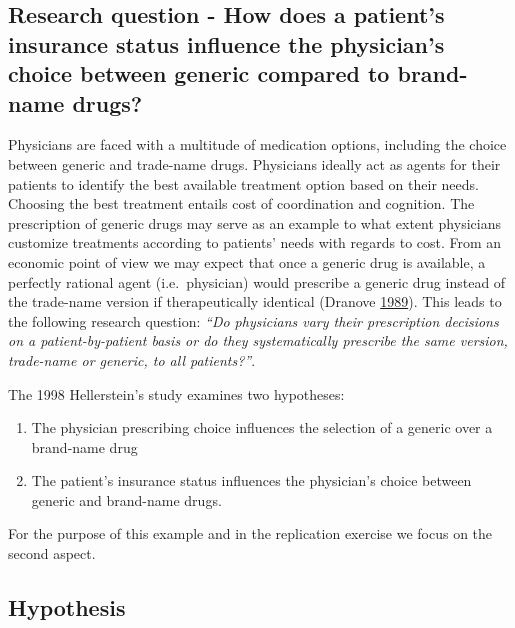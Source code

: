 \documentclass[
]{book}
\providecommand{\tightlist}{%
  \setlength{\itemsep}{0pt}\setlength{\parskip}{0pt}}
\begin{document}
\hypertarget{research-question---how-does-a-patients-insurance-status-influence-the-physicians-choice-between-generic-compared-to-brand-name-drugs}{%
\subsection{\texorpdfstring{\textbf{Research question - How does a
patient's insurance status influence the physician's choice between
generic compared to brand-name
drugs?}}{Research question - How does a patient's insurance status influence the physician's choice between generic compared to brand-name drugs?}}\label{research-question---how-does-a-patients-insurance-status-influence-the-physicians-choice-between-generic-compared-to-brand-name-drugs}}

Physicians are faced with a multitude of medication options, including
the choice between generic and trade-name drugs. Physicians ideally act
as agents for their patients to identify the best available treatment
option based on their needs. Choosing the best treatment entails cost of
coordination and cognition. The prescription of generic drugs may serve
as an example to what extent physicians customize treatments according
to patients' needs with regards to cost. From an economic point of view
we may expect that once a generic drug is available, a perfectly
rational agent (i.e.~physician) would prescribe a generic drug instead
of the trade-name version if therapeutically identical (Dranove
\protect\hyperlink{ref-dranove_medicaid_1989}{1989}). This leads to the
following research question: \emph{``Do physicians vary their
prescription decisions on a patient-by-patient basis or do they
systematically prescribe the same version, trade-name or generic, to all
patients?''}.

The 1998 Hellerstein's study examines two hypotheses:

\begin{enumerate}
\def\labelenumi{\arabic{enumi}.}
\tightlist
\item
  The physician prescribing choice influences the selection of a generic
  over a brand-name drug
\item
  The patient's insurance status influences the physician's choice
  between generic and brand-name drugs.
\end{enumerate}

For the purpose of this example and in the replication exercise we focus
on the second aspect.

\hypertarget{hypothesis-1}{%
\subsection{\texorpdfstring{\textbf{Hypothesis}}{Hypothesis}}\label{hypothesis-1}}
\end{document}
